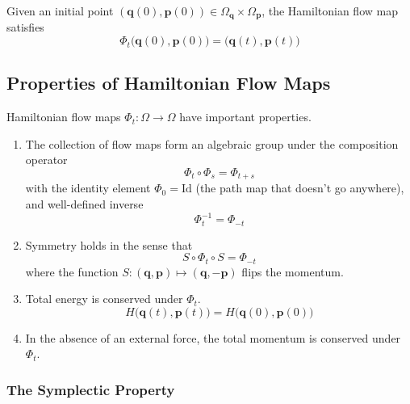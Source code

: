 \documentclass{article}
\begin{document}
    Given an initial point $(\mathbf{q}(0), \mathbf{p}(0)) \in \Omega_{\mathbf{q}} \times \Omega_{\mathbf{p}}$, the Hamiltonian flow map satisfies 
    \[\Phi_t \big( \mathbf{q}(0), \mathbf{p}(0) \big) = \big(\mathbf{q}(t), \mathbf{p}(t)\big)\]

  \subsection{Properties of Hamiltonian Flow Maps}

    Hamiltonian flow maps $\Phi_t : \Omega \longrightarrow \Omega$ have important properties. 
    \begin{enumerate}
        \item The collection of flow maps form an algebraic group under the composition operator
        \[\Phi_t \circ \Phi_s = \Phi_{t + s}\]
        with the identity element $\Phi_0 = \mathrm{Id}$ (the path map that doesn't go anywhere), and well-defined inverse 
        \[\Phi_t^{-1} = \Phi_{-t}\]
        \item Symmetry holds in the sense that 
        \[S \circ \Phi_t \circ S = \Phi_{-t}\]
        where the function $S: (\mathbf{q}, \mathbf{p}) \mapsto (\mathbf{q}, -\mathbf{p})$ flips the momentum. 
        \item Total energy is conserved under $\Phi_t$. 
        \[H\big( \mathbf{q}(t), \mathbf{p}(t) \big) = H\big( \mathbf{q}(0), \mathbf{p}(0) \big)\]
        \item In the absence of an external force, the total momentum is conserved under $\Phi_t$. 
    \end{enumerate}

    \subsubsection{The Symplectic Property}
\end{document}
